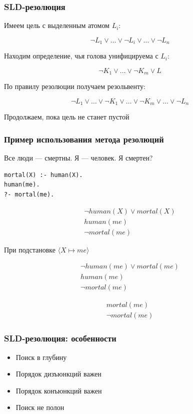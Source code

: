 \documentclass{beamer}
\begin{document}
\begin{frame}[fragile]
  \frametitle{SLD-резолюция}
\begin{center}
  Имеем цель с выделенным атомом $L_i$:
\end{center}
\[
  \neg L_1 \vee \dots \vee \neg L_i \vee \dots \vee \neg L_n
\]
\begin{center}
  Находим определение, чья голова унифицируема с $L_i$:
\end{center}
\[
  \neg K_1 \vee \dots \vee \neg K_m \vee L
\]
\begin{center}
  По правилу резолюции получаем резольвенту:
\end{center}
\[
  \neg L_1 \vee \dots \vee \neg K_1 \vee \dots \vee  \neg K_m \vee \dots \vee \neg L_n
\]

\begin{center}
  Продолжаем, пока цель не станет пустой
\end{center}
\end{frame}

\begin{frame}[fragile]
  \frametitle{Пример использования метода резолюций}
Все люди --- смертны. Я --- человек. Я смертен?

\begin{verbatim}
mortal(X) :- human(X).
human(me).
?- mortal(me).
\end{verbatim}

\[
  \begin{array}{c}
    \neg human(X) \vee mortal(X) \\
    human(me) \\
    \neg mortal(me)
  \end{array}
\]

При подстановке $\langle X \mapsto me \rangle$

\[
  \begin{array}{c}
    \neg human(me) \vee mortal(me) \\
    human(me) \\
    \neg mortal(me)
  \end{array}
\]

\[
  \begin{array}{c}
    mortal(me) \\
    \neg mortal(me)
  \end{array}
\]

\end{frame}

\begin{frame}[fragile]
  \frametitle{SLD-резолюция: особенности}
  \begin{itemize}
    \item Поиск в глубину
    \item Порядок дизъюнкций важен
    \item Порядок конъюнкций важен
    \item Поиск не полон
  \end{itemize}
\end{frame}
\end{document}
